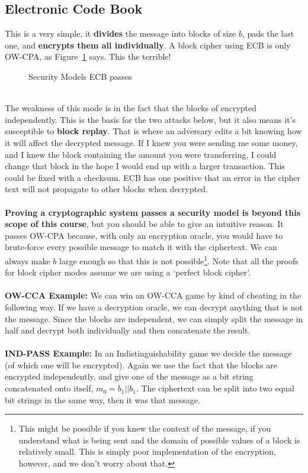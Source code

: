     \subsection{Electronic Code Book}
    This is a very simple, it \textbf{divides} the message into blocks of size $b$, pads the last one, and \textbf{encrypts them all individually}. A block cipher using ECB is only OW-CPA, as Figure~\ref{fig:ecb-attacktable} says. This the terrible!\\
    \begin{figure}[htp!]
    \centering
    \caption{Security Models ECB passes}
    \label{fig:ecb-attacktable}
    \end{figure}
    \\
    The weakness of this mode is in the fact that the blocks of encrypted independently. This is the basis for the two attacks below, but it also means it's susceptible to \textbf{block replay}. That is where an adversary edits a bit knowing how it will affect the decrypted message. If I knew you were sending me some money, and I knew the block containing the amount you were transferring, I could change that block in the hope I would end up with a larger transaction. This could be fixed with a checksum. ECB has one positive that an error in the cipher text will not propagate to other blocks when decrypted.\\
    \\
    \textbf{Proving a cryptographic system passes a security model is beyond this scope of this course}, but you should be able to give an intuitive reason. It passes OW-CPA because, with only an encryption oracle, you would have to brute-force every possible message to match it with the ciphertext. We can always make $b$ large enough so that this is not possible\footnote{This might be possible if you knew the context of the message, if you understand what is being sent and the domain of possible values of a block is relatively small. This is simply poor implementation of the encryption, however, and we don't worry about that.}. Note that all the proofs for block cipher modes assume we are using a `perfect block cipher'.\\
    \\
    \textbf{OW-CCA Example:} We can win an OW-CCA game by kind of cheating in the following way. If we have a decryption oracle, we can decrypt anything that is not the message. Since the blocks are independent, we can simply split the message in half and decrypt both individually and then concatenate the result.\\
    \\
    \textbf{IND-PASS Example:} In an Indistinguishability game we decide the message (of which one will be encrypted). Again we use the fact that the blocks are encrypted independently, and give one of the message as a bit string concatenated onto itself, $m_0=b_1||b_1$. The ciphertext can be split into two equal bit strings in the same way, then it was that message.
    
